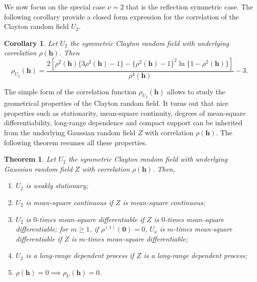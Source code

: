 \documentclass[times,sort&compress,3p]{elsarticle}
\theoremstyle{plain}%
\newtheorem{theorem}{Theorem}
\newtheorem{corollary}{Corollary}
\theoremstyle{definition}
\def\hh{\bm{h}}
\begin{document}
We now focus on the special case $\nu=2$ that is the reflection symmetric case. The following corollary provide  a closed form expression for the correlation of the Clayton  random field $U_{2}$.

\begin{corollary}\label{theo5}
Let $U_{2}$ the symmetric Clayton random field with underlying correlation $\rho(\hh)$. Then
\begin{equation}\label{corru_nu2}
\rho_{U_2}(\hh)=\frac{2[\rho^2(\hh)\{3\rho^2(\hh)-1\}-\{\rho^2(\hh)-1\}^2 \ln\{1-\rho^2(\hh)\}]}{\rho^4(\hh)}-3.
\end{equation}
\end{corollary}


The simple form of the correlation function $\rho_{U_2}(\hh)$ allows to study the geometrical properties of the Clayton random field. It turns out that nice properties such as stationarity, mean-square continuity, degrees of mean-square differentiability, long-range dependence and compact support can be inherited from the underlying Gaussian random field $Z$ with correlation $\rho(\hh)$. The following theorem resumes all these properties.
\begin{theorem}\label{theo6}
Let $U_{2}$ the symmetric Clayton  random field    with underlying Gaussian random field $Z$ with correlation $\rho(\hh)$. Then,
\begin{enumerate}
\item[(i)] $U_2$ is weakly stationary;
\item[(ii)] $U_2$ is mean-square continuous if $Z$ is mean-square continuous;
\item[(iii)] $U_2$ is $0$-times mean-square differentiable if  $Z$  is $0$-times mean-square differentiable;
     for $m\geq 1$, if $\rho^{(1)}(\bm{0})=0$,  $U_{\nu}$ is $m$-times mean-square differentiable if  $Z$  is $m$-times mean-square differentiable;
\item[(iv)]  $U_2$ is  a long-range dependent process  if  $Z$ is a  long-range dependent process;
\item[(v)] $\rho(\hh)=0 \implies \rho_{U}(\hh)=0$.
\end{enumerate}
\end{theorem}
\end{document}
